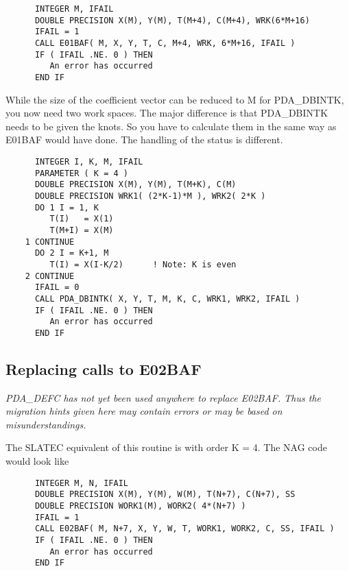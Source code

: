 \begin{verbatim}
      INTEGER M, IFAIL
      DOUBLE PRECISION X(M), Y(M), T(M+4), C(M+4), WRK(6*M+16)
      IFAIL = 1
      CALL E01BAF( M, X, Y, T, C, M+4, WRK, 6*M+16, IFAIL )
      IF ( IFAIL .NE. 0 ) THEN
         An error has occurred
      END IF
\end{verbatim}

   While the size of the coefficient vector can be reduced to M for
   PDA\_DBINTK, you now need two work spaces.
   The major difference is that PDA\_DBINTK needs to be given the knots. So
   you have to calculate them in the same way as E01BAF would have done.
   The handling of the status is different.

\begin{verbatim}
      INTEGER I, K, M, IFAIL
      PARAMETER ( K = 4 )
      DOUBLE PRECISION X(M), Y(M), T(M+K), C(M)
      DOUBLE PRECISION WRK1( (2*K-1)*M ), WRK2( 2*K )
      DO 1 I = 1, K
         T(I)   = X(1)
         T(M+I) = X(M)
    1 CONTINUE
      DO 2 I = K+1, M
         T(I) = X(I-K/2)      ! Note: K is even
    2 CONTINUE
      IFAIL = 0
      CALL PDA_DBINTK( X, Y, T, M, K, C, WRK1, WRK2, IFAIL )
      IF ( IFAIL .NE. 0 ) THEN
         An error has occurred
      END IF
\end{verbatim}


\subsection{\label{m_e02baf}Replacing calls to E02BAF}

{\em 
   PDA\_DEFC has not yet been used anywhere to replace E02BAF. Thus the
   migration hints given here may contain errors or may be based on
   misunderstandings.
\/}

   The SLATEC equivalent of this routine is
   with order K = 4. The
   NAG code would look like

\begin{verbatim}
      INTEGER M, N, IFAIL
      DOUBLE PRECISION X(M), Y(M), W(M), T(N+7), C(N+7), SS
      DOUBLE PRECISION WORK1(M), WORK2( 4*(N+7) )
      IFAIL = 1
      CALL E02BAF( M, N+7, X, Y, W, T, WORK1, WORK2, C, SS, IFAIL )
      IF ( IFAIL .NE. 0 ) THEN
         An error has occurred
      END IF
\end{verbatim}

